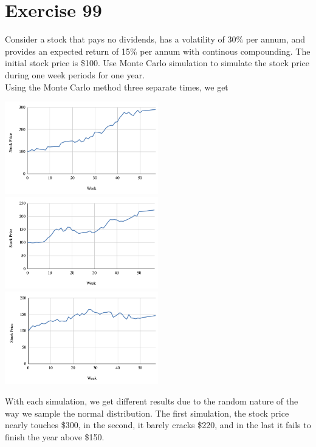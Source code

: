 \documentclass{article}
\begin{document}
\section*{Exercise 99}
\begin{flushleft}
    Consider a stock that pays no dividends, has a volatility of 30\% per annum, and provides an expected return of 15\% per annum with continous compounding. The initial stock price is \$100. Use Monte Carlo simulation to simulate the stock price during one week periods for one year. \\
    Using the Monte Carlo method three separate times, we get
    \begin{center}
        \includegraphics[width=0.5\textwidth]{figures/mc1.png}
        \includegraphics[width=0.5\textwidth]{figures/mc2.png}
        \includegraphics[width=0.5\textwidth]{figures/mc3.png}
    \end{center}
    With each simulation, we get different results due to the random nature of the way we sample the normal distribution. The first simulation, the stock price nearly touches \$300, in the second, it barely cracks \$220, and in the last it fails to finish the year above \$150.
\end{flushleft}
\end{document}
